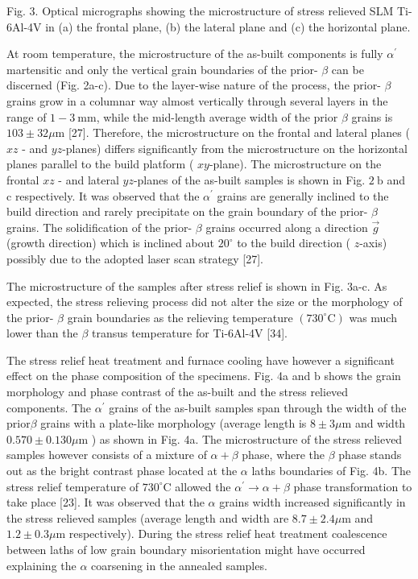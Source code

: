 \documentclass[10pt]{article}
\begin{document}
Fig. 3. Optical micrographs showing the microstructure of stress relieved SLM Ti-6Al-4V in (a) the frontal plane, (b) the lateral plane and (c) the horizontal plane.

At room temperature, the microstructure of the as-built components is fully $\alpha^{\prime}$ martensitic and only the vertical grain boundaries of the prior- $\beta$ can be discerned (Fig. 2a-c). Due to the layer-wise nature of the process, the prior- $\beta$ grains grow in a columnar way almost vertically through several layers in the range of $1-3 \mathrm{~mm}$, while the mid-length average width of the prior $\beta$ grains is $103 \pm 32 \mu \mathrm{m}$ [27]. Therefore, the microstructure on the frontal and lateral planes ( $x z$ - and $y z$-planes) differs significantly from the microstructure on the horizontal planes parallel to the build platform ( $x y$-plane). The microstructure on the frontal $x z$ - and lateral $y z$-planes of the as-built samples is shown in Fig. $2 \mathrm{~b}$ and $\mathrm{c}$ respectively. It was observed that the $\alpha^{\prime}$ grains are generally inclined to the build direction and rarely precipitate on the grain boundary of the prior- $\beta$ grains. The solidification of the prior- $\beta$ grains occurred along a direction $\vec{g}$ (growth direction) which is inclined about $20^{\circ}$ to the build direction ( $z$-axis) possibly due to the adopted laser scan strategy [27].

The microstructure of the samples after stress relief is shown in Fig. 3a-c. As expected, the stress relieving process did not alter the size or the morphology of the prior- $\beta$ grain boundaries as the relieving temperature $\left(730^{\circ} \mathrm{C}\right)$ was much lower than the $\beta$ transus temperature for Ti-6Al-4V [34].

The stress relief heat treatment and furnace cooling have however a significant effect on the phase composition of the specimens. Fig. 4a and $\mathrm{b}$ shows the grain morphology and phase contrast of the as-built and the stress relieved components. The $\alpha^{\prime}$ grains of the as-built samples span through the width of the prior$\beta$ grains with a plate-like morphology (average length is $8 \pm 3 \mu \mathrm{m}$ and width $0.570 \pm 0.130 \mu \mathrm{m}$ ) as shown in Fig. 4a. The microstructure of the stress relieved samples however consists of a mixture of $\alpha+\beta$ phase, where the $\beta$ phase stands out as the bright contrast phase located at the $\alpha$ laths boundaries of Fig. 4b. The stress relief temperature of $730^{\circ} \mathrm{C}$ allowed the $\alpha^{\prime} \rightarrow \alpha+\beta$ phase transformation to take place [23]. It was observed that the $\alpha$ grains width increased significantly in the stress relieved samples (average length and width are $8.7 \pm 2.4 \mu \mathrm{m}$ and $1.2 \pm 0.3 \mu \mathrm{m}$ respectively). During the stress relief heat treatment coalescence between laths of low grain boundary misorientation might have occurred explaining the $\alpha$ coarsening in the annealed samples.
\end{document}

